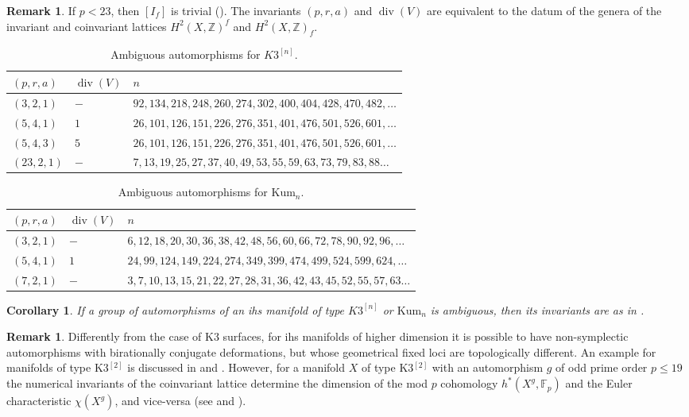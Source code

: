 \documentclass{amsart}
\theoremstyle{definition}
\newtheorem{remark}[definition]{Remark}
\theoremstyle{plain}
\newtheorem{corollary}[definition]{Corollary}
\newcommand{\ZZ}{\mathbb{Z}}
\newcommand{\kumn}{\mathrm{Kum}_n}
\newcommand{\hskn}{K3^{\left[n\right]}}
\renewcommand{\div}{\mathop{div}}
\begin{document}
\begin{remark}
 If $p<23$, then $[I_f]$ is trivial ().
 The invariants $(p,r,a)$ and $\div(V)$ are equivalent
 to the datum of the genera of the invariant and coinvariant lattices $H^2(X,\ZZ)^f$ and $H^2(X,\ZZ)_f$.
\end{remark}
 \begin{table} 
 \caption{Ambiguous automorphisms for $\hskn$.}\label{tbl:ambiguous-k3n}
  \begin{tabular}{lll}
   \toprule
   $(p,r,a)$ & $\div(V)$ & $n$\\
   \midrule
   $(3,2,1)$   & $-$ & $92, 134, 218, 248, 260, 274, 302, 400, 404, 428, 470, 482, \dots$\\
   $(5,4,1)$   & $1$ & $26, 101, 126, 151, 226, 276, 351, 401, 476, 501, 526, 601, \dots $\\
   $(5,4,3)$   & $5$ & $26, 101, 126, 151, 226, 276, 351, 401, 476, 501, 526, 601, \dots$\\
   $(23,2,1)$ & $-$ & $ 7, 13, 19, 25, 27, 37, 40, 49, 53, 55, 59, 63, 73, 79, 83,88 \dots$ \\
   \bottomrule
  \end{tabular}
\end{table}

 \begin{table}
 \caption{Ambiguous automorphisms for $\kumn$.}\label{tbl:ambiguous-kumn}
  \begin{tabular}{lll}
   \toprule
   $(p,r,a)$ & $\div(V)$ & $n$\\
   \midrule
   $(3,2,1)$   & $-$ & $6, 12, 18, 20, 30, 36, 38, 42, 48, 56, 60, 66, 72, 78, 90, 92,96,\dots $\\
   $(5,4,1)$   & $1$ & $24, 99, 124, 149, 224, 274, 349, 399, 474, 499, 524, 599, 624, \dots$\\
   $(7,2,1)$ & $-$ & $3, 7, 10, 13, 15, 21, 22, 27, 28, 31, 36, 42, 43, 45, 52, 55, 57, 63 \dots$\\
\bottomrule
  \end{tabular}
\end{table}

\begin{corollary}
If a group of automorphisms of an ihs manifold of type $\hskn$ or $\kumn$ is ambiguous, then its invariants are as in .
\end{corollary}

\begin{remark}
Differently from the case of K3 surfaces, for ihs manifolds of higher dimension it is possible to have non-symplectic automorphisms with birationally conjugate deformations, but whose geometrical fixed loci are topologically different. An example for manifolds of type K3$^{[2]}$ is discussed in \cite[Rmk.\ 7.7]{bcs} and \cite[§7.2]{bcs:ball}. However, for a manifold $X$ of type K3$^{[2]}$ with an automorphism $g$ of odd prime order $p \leq 19$ the numerical invariants of the coinvariant lattice determine the dimension of the mod $p$ cohomology $h^*(X^g, \mathbb{F}_p)$ and the Euler characteristic $\chi(X^g)$, and vice-versa (see \cite[Thm.\ 2]{smith} and \cite[\S 3.2, Appendix A]{bcs}).
\end{remark}
\end{document}
